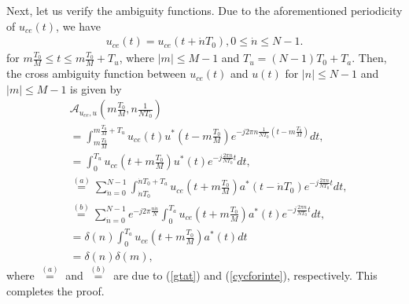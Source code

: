 \documentclass[journal]{IEEEtran}
\begin{document}
{Next, let us verify the ambiguity functions. Due to the aforementioned periodicity of  $u_{ce}(t)$, we have
\begin{align}\label{cycforinte}
  u_{ce}(t)=u_{ce}(t+\dot nT_0), 0\le \dot n \le N-1.
\end{align}
for $m\frac{T_0}{M} \le  t \le m\frac{T_0}{M}+T_u$, where $|m| \le M-1$ and $T_u=(N-1)T_0+T_a$. Then, the cross ambiguity function between $u_{ce}(t)$ and $u(t)$ for $|n|\le N-1$ and $|m|\le M-1$ is given by %
\begin{align}
   & \mathcal A_{u_{ce},u}\left(m\frac{T_0}{M}, n\frac{1}{NT_0}\right) \nonumber                                                                                             \\
   & =  \int_{m\frac{T_0}{M}}^{m\frac{T_0}{M}+T_u} u_{ce}(t)u^*\left(t-m\frac{T_0}{M}\right)e^{-j2\pi n\frac{1}{NT_0}(t-m\frac{T_0}{M})} dt, \nonumber                       \\
   & = \int_0 ^{T_u} u_{ce}\left(t+m\frac{T_0}{M}\right)u^*(t)e^{-j\frac{2\pi n}{NT_0}t} dt, \nonumber                                                                       \\
   & \stackrel{(a)}{=} \sum_{\dot n=0}^{N-1} \int_{\dot n T_0} ^{\dot n T_0+T_a} u_{ce}\left(t+m\frac{T_0}{M}\right)a^*(t-\dot nT_0)e^{-j\frac{2\pi n}{NT_0}t} dt, \nonumber \\
   & \stackrel{(b)}{=} \sum_{\dot n=0}^{N-1} e^{-j2\pi\frac{n\dot n}{N}}  \int_0^{T_a} u_{ce}\left(t+m\frac{T_0}{M}\right)a^*(t)e^{-j\frac{2\pi n}{NT_0}t} dt, \nonumber     \\
   & = \delta(n)\int_0^{T_a} u_{ce}\left(t+m\frac{T_0}{M}\right)a^*(t)dt \nonumber                                                                                           \\
   & =\delta(n)\delta(m), \label{orthoam}
\end{align}
where $\stackrel{(a)}{=}$ and $\stackrel{(b)}{=}$ are due to (\ref{gtat}) and (\ref{cycforinte}), respectively. {This} completes the proof.







}
\end{document}
